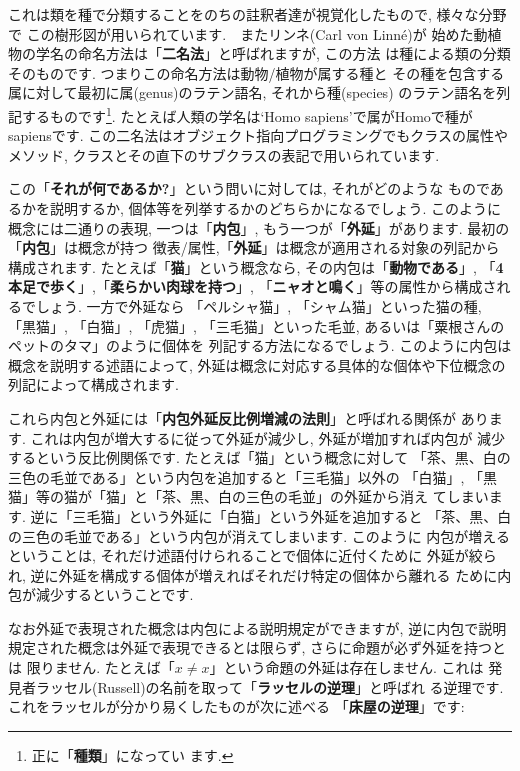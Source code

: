 これは類を種で分類することをのちの註釈者達が視覚化したもので, 様々な分野で
この樹形図が用いられています.　またリンネ(Carl von Linn\'e)が
始めた動植物の学名の命名方法は「\textbf{二名法}」と呼ばれますが, この方法
は種による類の分類そのものです. つまりこの命名方法は動物/植物が属する種と
その種を包含する属に対して最初に属(genus)のラテン語名, それから種(species)
のラテン語名を列記するものです\footnote{正に「\textbf{種類}」になってい
ます.}. たとえば人類の学名は`Homo sapiens'で属がHomoで種がsapiensです.
 この二名法はオブジェクト指向プログラミングでもクラスの属性やメソッド,
 クラスとその直下のサブクラスの表記で用いられています.
\newline


この「\textbf{それが何であるか?}」という問いに対しては, それがどのような
ものであるかを説明するか, 個体等を列挙するかのどちらかになるでしょう.
 このように概念には二通りの表現, 一つは「\textbf{内包}」, もう一つが「\textbf{外延}」があります. 最初の「\textbf{内包}」は概念が持つ
徴表/属性,「\textbf{外延}」は概念が適用される対象の列記から構成されます.
 たとえば「\textbf{猫}」という概念なら, その内包は「\textbf{動物である}」,
 「\textbf{4本足で歩く}」,「\textbf{柔らかい肉球を持つ}」,
 「\textbf{ニャオと鳴く}」等の属性から構成されるでしょう. 一方で外延なら
 「ペルシャ猫」, 「シャム猫」といった猫の種, 「黒猫」, 「白猫」, 「虎猫」,
 「三毛猫」といった毛並, あるいは「粟根さんのペットのタマ」のように個体を
列記する方法になるでしょう. このように内包は概念を説明する述語によって,
 外延は概念に対応する具体的な個体や下位概念の列記によって構成されます.
\newline


これら内包と外延には「\textbf{内包外延反比例増減の法則}」と呼ばれる関係が
あります. これは内包が増大するに従って外延が減少し, 外延が増加すれば内包が
減少するという反比例関係です. たとえば「猫」という概念に対して
「茶、黒、白の三色の毛並である」という内包を追加すると「三毛猫」以外の
「白猫」, 「黒猫」等の猫が「猫」と「茶、黒、白の三色の毛並」の外延から消え
てしまいます. 逆に「三毛猫」という外延に「白猫」という外延を追加すると
「茶、黒、白の三色の毛並である」という内包が消えてしまいます. このように
内包が増えるということは, それだけ述語付けられることで個体に近付くために
外延が絞られ, 逆に外延を構成する個体が増えればそれだけ特定の個体から離れる
ために内包が減少するということです.
\newline

なお外延で表現された概念は内包による説明規定ができますが, 逆に内包で説明
規定された概念は外延で表現できるとは限らず, さらに命題が必ず外延を持つとは
限りません. たとえば「$x \neq x$」という命題の外延は存在しません. これは
発見者ラッセル(Russell)の名前を取って「\textbf{ラッセルの逆理}」と呼ばれ
る逆理です. これをラッセルが分かり易くしたものが次に述べる
「\textbf{床屋の逆理}」です:

